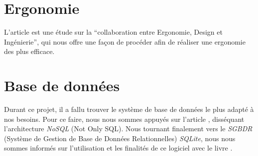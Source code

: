 \section{Ergonomie}

L'article \cite{lente2014scenariser} est une étude sur la “collaboration entre Ergonomie, Design et Ingénierie”, qui nous offre une façon de procéder afin de réaliser une ergonomie des plus efficace.

\section{Base de données}

Durant ce projet, il a fallu trouver le système de base de données le plus adapté à nos besoins. Pour ce faire, nous nous sommes appuyés sur l'article \cite{strauchnosql}, disséquant l'architecture \textit{NoSQL} (Not Only SQL).
Nous tournant finalement vers le \textit{SGBDR} (Système de Gestion de Base de Données Relationnelles) \textit{SQLite}, nous nous sommes informés sur l'utilisation et les finalités de ce logiciel avec le livre \cite{kreibich2010using}.

